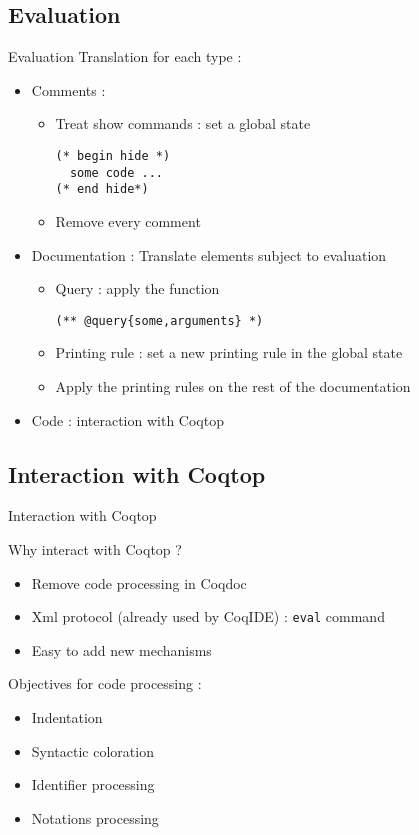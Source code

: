 \documentclass[compress]{beamer}
\newenvironment{tframe}[1]{
  \subsection{#1}
  \begin{frame}{#1}
  }{
  \end{frame}
  }
\begin{document}
    \subsection{Evaluation}
    \begin{frame}[containsverbatim]{Evaluation}
    Translation for each type :
    \begin{itemize}
      \item Comments : \\
         \begin{itemize}
           \item Treat show commands : set a global state
             \begin{lstlisting}
(* begin hide *)
  some code ...
(* end hide*)
\end{lstlisting}
           \item Remove every comment
        \end{itemize}
      \item Documentation : Translate elements subject to evaluation \\
        \begin{itemize}
          \item Query : apply the function
\begin{lstlisting}
(** @query{some,arguments} *)
\end{lstlisting}

          \item Printing rule : set a new printing rule in the global state
          \item Apply the printing rules on the rest of the documentation
        \end{itemize}
      \item Code : interaction with Coqtop
    \end{itemize}
  \end{frame}


  \begin{tframe}{Interaction with Coqtop}
    Why interact with Coqtop ?
    \begin{itemize}
      \item Remove code processing in Coqdoc
      \item Xml protocol (already used by CoqIDE) : \texttt{eval} command
      \item Easy to add new mechanisms
    \end{itemize}
    \vfill
    Objectives for code processing :
    \begin{itemize}
      \item Indentation
      \item Syntactic coloration
      \item Identifier processing
      \item Notations processing %
    \end{itemize}
  \end{tframe}
\end{document}
